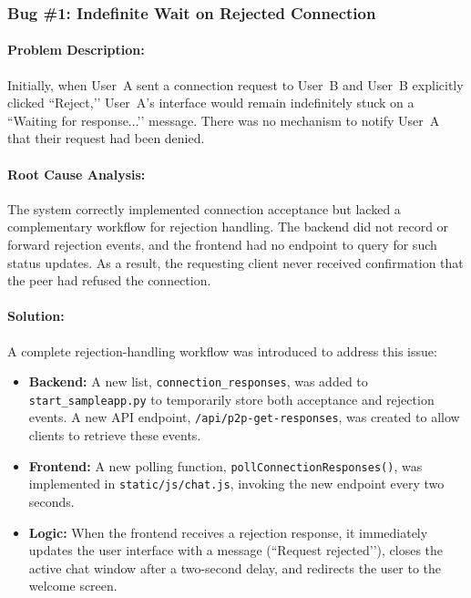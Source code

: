 \subsubsection{Bug \#1: Indefinite Wait on Rejected Connection}

\paragraph{Problem Description:}
Initially, when User~A sent a connection request to User~B and User~B explicitly clicked ``Reject,’’ 
User~A’s interface would remain indefinitely stuck on a ``Waiting for response...’’ message. 
There was no mechanism to notify User~A that their request had been denied.

\paragraph{Root Cause Analysis:}
The system correctly implemented connection acceptance but lacked a complementary workflow for rejection handling. 
The backend did not record or forward rejection events, and the frontend had no endpoint to query for such status updates. 
As a result, the requesting client never received confirmation that the peer had refused the connection.

\paragraph{Solution:}
A complete rejection-handling workflow was introduced to address this issue:
\begin{itemize}
    \item \textbf{Backend:} A new list, \texttt{connection\_responses}, was added to \texttt{start\_sampleapp.py} to temporarily store both acceptance and rejection events. 
    A new API endpoint, \texttt{/api/p2p-get-responses}, was created to allow clients to retrieve these events.
    \item \textbf{Frontend:} A new polling function, \texttt{pollConnectionResponses()}, was implemented in \texttt{static/js/chat.js}, invoking the new endpoint every two seconds.
    \item \textbf{Logic:} When the frontend receives a rejection response, it immediately updates the user interface with a message (``Request rejected’’), closes the active chat window after a two-second delay, and redirects the user to the welcome screen.
\end{itemize}

